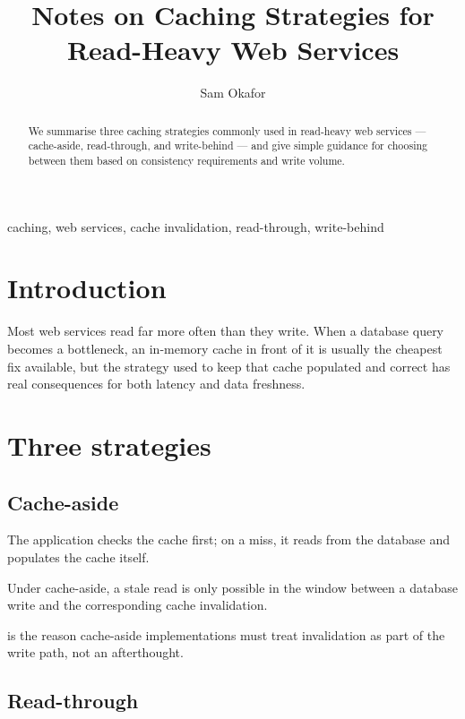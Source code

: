 \documentclass{lebhart}
\title{Notes on Caching Strategies for Read-Heavy Web Services}
\author{Sam Okafor}
\date{\TheDate{2026-01-15}}
\begin{document}
\maketitle

\begin{abstract}
We summarise three caching strategies commonly used in read-heavy web
services --- cache-aside, read-through, and write-behind --- and give
simple guidance for choosing between them based on consistency
requirements and write volume.
\end{abstract}
\begin{keyword}
caching, web services, cache invalidation, read-through, write-behind
\end{keyword}

\section{Introduction}

Most web services read far more often than they write. When a
database query becomes a bottleneck, an in-memory cache in front of it
is usually the cheapest fix available, but the strategy used to keep
that cache populated and correct has real consequences for both
latency and data freshness.

\section{Three strategies}

\subsection{Cache-aside}

The application checks the cache first; on a miss, it reads from the
database and populates the cache itself.

\begin{theorem}\label{thm:aside}
Under cache-aside, a stale read is only possible in the window between
a database write and the corresponding cache invalidation.
\end{theorem}

 is the reason cache-aside implementations must treat
invalidation as part of the write path, not an afterthought.

\subsection{Read-through}
\end{document}
